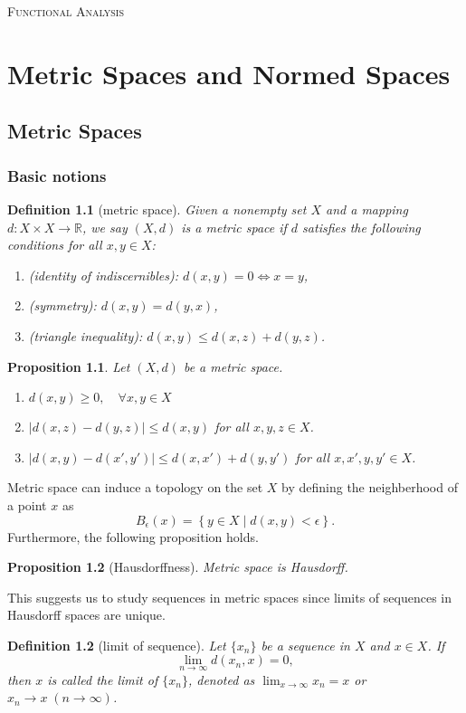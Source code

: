 \documentclass{report}
\newtheorem{definition}{Definition}[section]
\newtheorem{proposition}{Proposition}[section]
\theoremstyle{nonumberplain}
\begin{document}
\begin{center}
	\textsc{\Huge Functional Analysis}
	~\\
	\vspace{1em}  
	
\end{center}
\vspace{1em} 
\tableofcontents
\chapter{Metric Spaces and Normed Spaces}
\section{Metric Spaces}
\subsection{Basic notions}
\begin{definition}[metric space]
	Given a nonempty set $X$ and a mapping $d:X\times X\to \mathbb{R}$, we say $(X,d)$ is a \emph{metric space} if $d$ satisfies the following conditions for all $x,y\in X$:
	\begin{enumerate}
		\item (identity of indiscernibles): $d(x,y)=0\iff x=y$,
		\item (symmetry): $d(x,y)=d(y,x)$,
		\item (triangle inequality): $d(x,y)\le d(x,z)+d(y,z)$.
	\end{enumerate}	
\end{definition}
\begin{proposition}
	Let $(X,d)$ be a metric space.
	\begin{enumerate}
		\item $d(x,y)\ge 0,\quad\forall x,y\in X$
		\item $|d(x,z)-d(y,z)|\le d(x,y)$ for all $x,y,z\in X$.
		\item $|d(x,y)-d(x',y')|\le d(x,x')+d(y,y')$ for all $x,x',y,y'\in X$.
	\end{enumerate}
\end{proposition}
Metric space can induce a topology on the set $X$ by defining the neighberhood of a point $x$ as 
\[
	B_\epsilon(x)=\left\{y\in X\mid d(x,y)<\epsilon \right\}.
\]
Furthermore, the following proposition holds.

\begin{proposition}[Hausdorffness]
	Metric space is Hausdorff.
\end{proposition}
This suggests us to study sequences in metric spaces since limits of sequences in Hausdorff spaces are unique. 
\begin{definition}[limit of sequence]
	Let $\{x_n\}$ be a sequence in $X$ and $x\in X$. If
	\[
		\lim_{n\to\infty}d(x_n,x)=0,
	\]
	then $x$ is called the \emph{limit} of $\{x_n\}$, denoted as $\lim_{x\to\infty}x_n=x$ or $x_n\to x\;(n\to\infty)$.
\end{definition}
\end{document}
